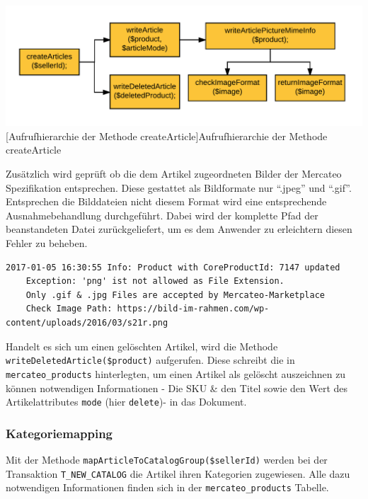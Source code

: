 		\begin{minipage}{\linewidth}
			\vspace{1em}
			\centering
			\includegraphics[width=0.7 \linewidth]{img/createArticleHierarchie}
			[Aufrufhierarchie der Methode createArticle]{Aufrufhierarchie der Methode createArticle}
			\vspace{1em}
		\end{minipage}
	
	Zusätzlich wird geprüft ob die dem Artikel zugeordneten Bilder der Mercateo Spezifikation entsprechen. Diese gestattet als Bildformate nur \enquote{.jpeg} und \enquote{.gif}. Entsprechen die Bilddateien nicht diesem Format wird eine entsprechende Ausnahmebehandlung durchgeführt. Dabei wird der komplette Pfad der beanstandeten Datei zurückgeliefert, um es dem Anwender zu erleichtern diesen Fehler zu beheben.\\
	
	\begin{lstlisting}[caption={Konsolenausgabe bei falschem Bildformat}]
	2017-01-05 16:30:55 Info: Product with CoreProductId: 7147 updated
	Exception: 'png' ist not allowed as File Extension.
	Only .gif & .jpg Files are accepted by Mercateo-Marketplace
	Check Image Path: https://bild-im-rahmen.com/wp-content/uploads/2016/03/s21r.png
	\end{lstlisting}

	Handelt es sich um einen gelöschten Artikel, wird die Methode \texttt{writeDeletedArticle(\$pro\-duct)} aufgerufen. Diese schreibt die in \texttt{mercateo\_products} hinterlegten, um einen Artikel als gelöscht auszeichnen zu können notwendigen Informationen - Die SKU \& den Titel sowie den Wert des Artikelattributes \texttt{mode} (hier \texttt{delete})- in das Dokument.
	
	\subsubsection{Kategoriemapping}
	
	Mit der Methode \texttt{mapArticleToCatalogGroup(\$sellerId)} werden bei der Transaktion \texttt{T\_NEW\_CATALOG} die Artikel ihren Kategorien zugewiesen. Alle dazu notwendigen Informationen finden sich in der \texttt{mercateo\_products} Tabelle.
	
